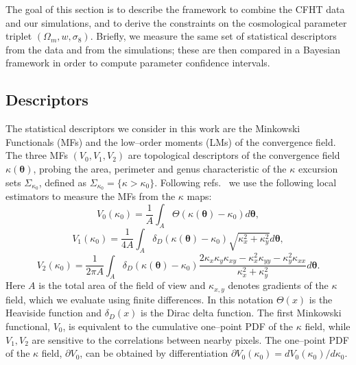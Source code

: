 \documentclass[reprint,aps,prd,superscriptaddress,showkeys,showpacs]{revtex4-1}
\begin{document}
The goal of this section is to describe the framework to combine the
CFHT data and our simulations, and to derive the constraints on the
cosmological parameter triplet $(\Omega_m,w,\sigma_8)$. Briefly, we
measure the same set of statistical descriptors from the data and from the
simulations; these are then compared in a Bayesian framework in
order to compute parameter confidence intervals.

\subsection{Descriptors}

The statistical descriptors we consider in this work are the Minkowski
Functionals (MFs) and the low--order moments (LMs) of the convergence
field. The three MFs $(V_0,V_1,V_2)$ are topological descriptors of
the convergence field $\kappa(\pmb{\theta})$, probing the area,
perimeter and genus characteristic of the $\kappa$ excursion sets
$\Sigma_{\kappa_0}$, defined as
$\Sigma_{\kappa_0}=\{\kappa>\kappa_0\}$. Following
refs.~\citep{Petri2013,MinkJan} we use the following local estimators
to measure the MFs from the $\kappa$ maps:
\begin{equation*}
\label{v0meas}
V_0(\kappa_0)=\frac{1}{A}\int_A\Theta(\kappa(\pmb{\theta})-\kappa_0)d\pmb{\theta},
\end{equation*}
\begin{equation}
\label{v1meas}
V_1(\kappa_0)=\frac{1}{4A}\int_A\delta_D(\kappa(\pmb{\theta})-\kappa_0)\sqrt{\kappa_x^2+\kappa_y^2}d\pmb{\theta},
\end{equation}
\begin{equation*}
\label{v2meas}
V_2(\kappa_0)=\frac{1}{2\pi A}\int_A\delta_D(\kappa(\pmb{\theta})-\kappa_0)\frac{2\kappa_x\kappa_y\kappa_{xy}-\kappa_x^2\kappa_{yy}-\kappa_y^2\kappa_{xx}}{\kappa_x^2+\kappa_y^2}d\pmb{\theta}.
\end{equation*}
Here $A$ is the total area of the field of view and $\kappa_{x,y}$
denotes gradients of the $\kappa$ field, which we evaluate using
finite differences. In this notation $\Theta(x)$ is the Heaviside function and $\delta_D(x)$ is the Dirac delta function.
The first Minkowski functional, $V_0$, is
equivalent to the cumulative one--point PDF of the $\kappa$ field,
while $V_1,V_2$ are sensitive to the correlations between nearby
pixels. The one--point PDF of the $\kappa$ field, $\partial V_0$, can
be obtained by differentiation $\partial
V_0(\kappa_0)=dV_0(\kappa_0)/d\kappa_0$. 
\end{document}
